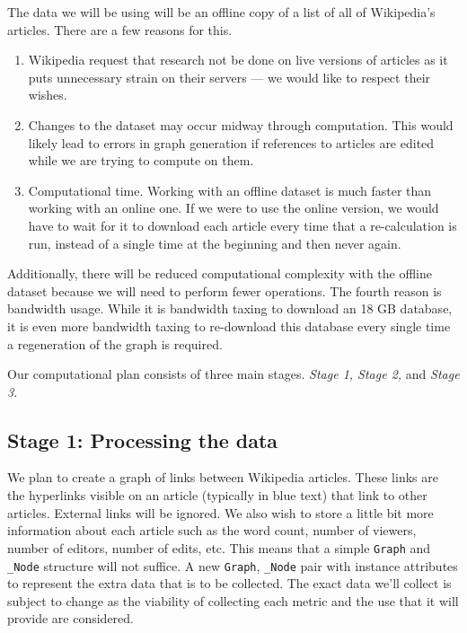 \documentclass[fontsize=12pt]{article}
\begin{document}
\begin{multicols}{2}
    The data we will be using will be an offline copy of a list of all of Wikipedia's articles. There are a few reasons for this. \begin{enumerate}
        \item Wikipedia request that research not be done on live versions of articles as it puts unnecessary strain on their servers --- we would like to respect their wishes.
        \item Changes to the dataset may occur midway through computation. This would likely lead to errors in graph generation if references to articles are edited while we are trying to compute on them.
        \item Computational time. Working with an offline dataset is much faster than working with an online one. If we were to use the online version, we would have to wait for it to download each article every time that a re-calculation is run, instead of a single time at the beginning and then never again.
    \end{enumerate}
    Additionally, there will be reduced computational complexity with the offline dataset because we will need to perform fewer operations. The fourth reason is bandwidth usage. While it is bandwidth taxing to download an 18 GB database, it is even more bandwidth taxing to re-download this database every single time a regeneration of the graph is required.
    
    
    Our computational plan consists of three main stages. \textit{Stage 1, Stage 2,} and \textit{Stage 3}.
    
    \subsection{Stage 1: Processing the data}
    We plan to create a graph of links between Wikipedia articles. These links are the hyperlinks visible on an article (typically in blue text) that link to other articles. External links will be ignored. We also wish to store a little bit more information about each article such as the word count, number of viewers, number of editors, number of edits, etc. This means that a simple \texttt{Graph} and \texttt{\_Node} structure will not suffice. A new \texttt{Graph}, \texttt{\_Node} pair with instance attributes to represent the extra data that is to be collected. The exact data we'll collect is subject to change as the viability of collecting each metric and the use that it will provide are considered. 
    

\end{multicols}
\end{document}
